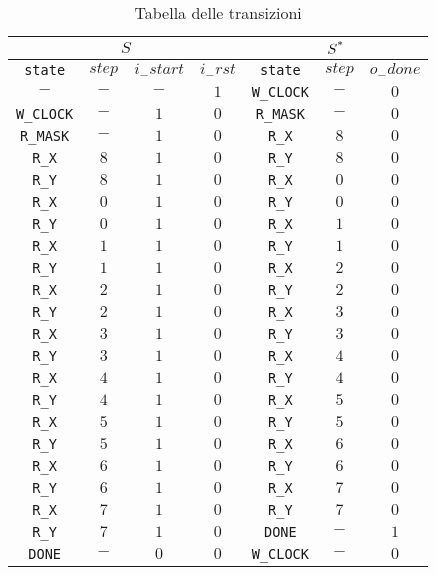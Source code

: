 \documentclass[a4paper]{report}
\begin{document}
\begin{center}
\begin{table}[H]
    \centering
    \begin{tabular}{|cccc||ccc|}
        \hline
        \multicolumn{4}{|c||}{$S$}&\multicolumn{3}{c|}{$S\textsuperscript{*}$}\\
        \hline
        \texttt{state}&$step$&$i_-start$&$i_-rst$&\texttt{state}&$step$&$o_-done$\\
        \hline\hline
        $-$&$-$&$-$&$1$&\texttt{W\_CLOCK}&$-$&$0$\\
        \texttt{W\_CLOCK}&$-$&$1$&$0$&\texttt{R\_MASK}&$-$&$0$\\
        \texttt{R\_MASK}&$-$&$1$&$0$&\texttt{R\_X}&$8$&$0$\\
        \texttt{R\_X}&$8$&$1$&$0$&\texttt{R\_Y}&$8$&$0$\\
        \texttt{R\_Y}&$8$&$1$&$0$&\texttt{R\_X}&$0$&$0$\\
        \texttt{R\_X}&$0$&$1$&$0$&\texttt{R\_Y}&$0$&$0$\\
        \texttt{R\_Y}&$0$&$1$&$0$&\texttt{R\_X}&$1$&$0$\\
        \texttt{R\_X}&$1$&$1$&$0$&\texttt{R\_Y}&$1$&$0$\\
        \texttt{R\_Y}&$1$&$1$&$0$&\texttt{R\_X}&$2$&$0$\\
        \texttt{R\_X}&$2$&$1$&$0$&\texttt{R\_Y}&$2$&$0$\\
        \texttt{R\_Y}&$2$&$1$&$0$&\texttt{R\_X}&$3$&$0$\\
        \texttt{R\_X}&$3$&$1$&$0$&\texttt{R\_Y}&$3$&$0$\\
        \texttt{R\_Y}&$3$&$1$&$0$&\texttt{R\_X}&$4$&$0$\\
        \texttt{R\_X}&$4$&$1$&$0$&\texttt{R\_Y}&$4$&$0$\\
        \texttt{R\_Y}&$4$&$1$&$0$&\texttt{R\_X}&$5$&$0$\\
        \texttt{R\_X}&$5$&$1$&$0$&\texttt{R\_Y}&$5$&$0$\\
        \texttt{R\_Y}&$5$&$1$&$0$&\texttt{R\_X}&$6$&$0$\\
        \texttt{R\_X}&$6$&$1$&$0$&\texttt{R\_Y}&$6$&$0$\\
        \texttt{R\_Y}&$6$&$1$&$0$&\texttt{R\_X}&$7$&$0$\\
        \texttt{R\_X}&$7$&$1$&$0$&\texttt{R\_Y}&$7$&$0$\\
        \texttt{R\_Y}&$7$&$1$&$0$&\texttt{DONE}&$-$&$1$\\
        \texttt{DONE}&$-$&$0$&$0$&\texttt{W\_CLOCK}&$-$&$0$\\
        \hline
    \end{tabular}
    \caption{Tabella delle transizioni}
\end{table}
\end{center}
\end{document}
